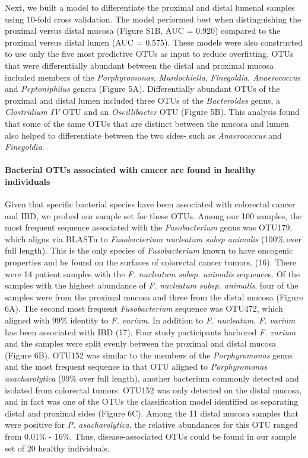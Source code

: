 \documentclass[11pt,]{article}
\let\oldparagraph\paragraph
\renewcommand{\paragraph}[1]{\oldparagraph{#1}\mbox{}}
\begin{document}
Next, we built a model to differentiate the proximal and distal lumenal
samples using 10-fold cross validation. The model performed best when
distinguishing the proximal versus distal mucosa (Figure S1B, AUC =
0.920) compared to the proximal versus distal lumen (AUC = 0.575). These
models were also constructed to use only the five most predictive OTUs
as input to reduce overfitting. OTUs that were differentially abundant
between the distal and proximal mucosa included members of the
\emph{Porphyromonas}, \emph{Murdochiella}, \emph{Finegoldia},
\emph{Anaerococcus} and \emph{Peptoniphilus} genera (Figure 5A).
Differentially abundant OTUs of the proximal and distal lumen included
three OTUs of the \emph{Bacteroides} genus, a \emph{Clostridium IV} OTU
and an \emph{Oscillibacter} OTU (Figure 5B). This analysis found that
some of the same OTUs that are distinct between the mucosa and lumen
also helped to differentiate between the two sides- such as
\emph{Anaerococcus} and \emph{Finegoldia}.

\paragraph{Bacterial OTUs associated with cancer are found in healthy
individuals}\label{bacterial-otus-associated-with-cancer-are-found-in-healthy-individuals}

Given that specific bacterial species have been associated with
colorectal cancer and IBD, we probed our sample set for these OTUs.
Among our 100 samples, the most frequent sequence associated with the
\emph{Fusobacterium} genus was OTU179, which aligns via BLASTn to
\emph{Fusobacterium nucleatum subsp animalis} (100\% over full length).
This is the only species of \emph{Fusobacterium} known to have oncogenic
properties and be found on the surfaces of colorectal cancer tumors.
(16). There were 14 patient samples with the \emph{F. nucleatum subsp.
animalis} sequences. Of the samples with the highest abundance of
\emph{F. nucleatum subsp. animalis}, four of the samples were from the
proximal mucosa and three from the distal mucosa (Figure 6A). The second
most frequent \emph{Fusobacterium} sequence was OTU472, which aligned
with 99\% identity to \emph{F. varium}. In addition to \emph{F.
nucleatum}, \emph{F. varium} has been associated with IBD (17). Four
study participants harbored \emph{F. varium} and the samples were split
evenly between the proximal and distal mucosa (Figure 6B). OTU152 was
similar to the members of the \emph{Porphyromonas} genus and the most
frequent sequence in that OTU aligned to \emph{Porphyromonas
asacharolytica} (99\% over full length), another bacterium commonly
detected and isolated from colorectal tumors. OTU152 was only detected
on the distal mucosa, and in fact was one of the OTUs the classification
model identified as separating distal and proximal sides (Figure 6C).
Among the 11 distal mucosa samples that were positive for \emph{P.
asacharolytica}, the relative abundances for this OTU ranged from 0.01\%
- 16\%. Thus, disease-associated OTUs could be found in our sample set
of 20 healthy individuals.
\end{document}
